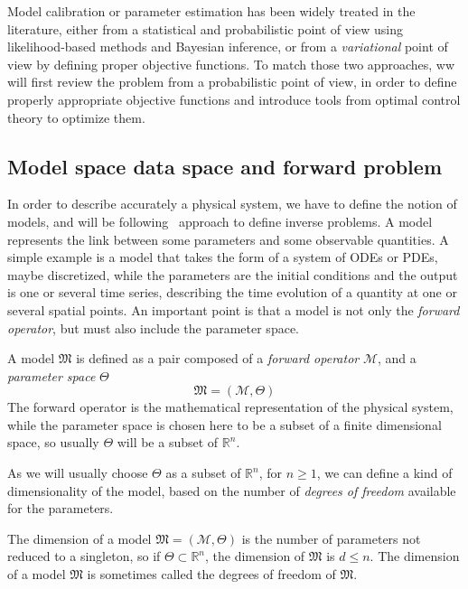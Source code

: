 \documentclass[../../Main_ManuscritThese.tex]{subfiles}
\begin{document}
Model calibration or parameter estimation has been widely treated in the literature, either from a statistical and probabilistic point of view using likelihood-based methods and Bayesian inference, or from a \emph{variational} point of view by defining proper objective functions. To match those two approaches, ww will first review the problem from a probabilistic point of view, in order to define properly appropriate objective functions and introduce tools from optimal control theory to optimize them.

 \subsection{Model space data space and forward problem}
\label{sec:model_space_data_space}
In order to describe accurately a physical system, we have to define the notion of models, and will be following~\cite{tarantola_inverse_2005} approach to define inverse problems.
 A model represents the link between some parameters and some observable quantities. A simple example is a model that takes the form of a system of ODEs or PDEs, maybe discretized, while the parameters are the initial conditions and the output is one or several time series, describing the time evolution of a quantity at one or several spatial points. An important point is that a model is not only the \emph{forward operator}, but must also include the parameter space.


 \begin{definition}[Model]
   \label{def:model}
  A model $\mathfrak{M}$ is defined as a pair composed of a \emph{forward operator} $\mathcal{M}$, and a \emph{parameter space} $\Theta$
  \begin{equation}
    \mathfrak{M} = (\mathcal{M}, \Theta)
  \end{equation}
The forward operator is the mathematical representation of the physical system, while the parameter space is chosen here to be a subset of a finite dimensional space, so usually $\Theta$ will be a subset of $\mathbb{R}^n$.
\end{definition}
As we will usually choose $\Theta$ as a subset of $\mathbb{R}^n$, for $n\geq 1$, we can define a kind of dimensionality of the model, based on the number of \emph{degrees of freedom} available for the parameters.

\begin{remark}
  \label{rmk:model_dimension}
  The dimension of a model $\mathfrak{M}=(\mathcal{M},\Theta)$ is the number of parameters not reduced to a singleton, so if $\Theta \subset \mathbb{R}^n$, the dimension of $\mathfrak{M}$ is $d \leq n$. The dimension of a model $\mathfrak{M}$ is sometimes called the degrees of freedom of $\mathfrak{M}$.
  \end{remark}
  
\end{document}
